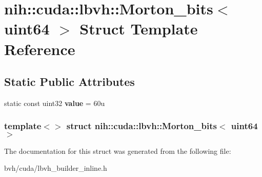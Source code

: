 \hypertarget{structnih_1_1cuda_1_1lbvh_1_1_morton__bits_3_01uint64_01_4}{
\section{nih\-:\-:cuda\-:\-:lbvh\-:\-:\-Morton\-\_\-bits$<$ uint64 $>$ \-Struct \-Template \-Reference}
\label{structnih_1_1cuda_1_1lbvh_1_1_morton__bits_3_01uint64_01_4}
}
\subsection*{\-Static \-Public \-Attributes}
\begin{DoxyCompactItemize}
\item 
\hypertarget{structnih_1_1cuda_1_1lbvh_1_1_morton__bits_3_01uint64_01_4_a1968e6a717daf1efa9201527813b73da}{
static const uint32 {\bfseries value} = 60u}
\label{structnih_1_1cuda_1_1lbvh_1_1_morton__bits_3_01uint64_01_4_a1968e6a717daf1efa9201527813b73da}

\end{DoxyCompactItemize}
\subsubsection*{template$<$$>$ struct nih\-::cuda\-::lbvh\-::\-Morton\-\_\-bits$<$ uint64 $>$}



\-The documentation for this struct was generated from the following file\-:\begin{DoxyCompactItemize}
\item 
bvh/cuda/lbvh\-\_\-builder\-\_\-inline.\-h\end{DoxyCompactItemize}
